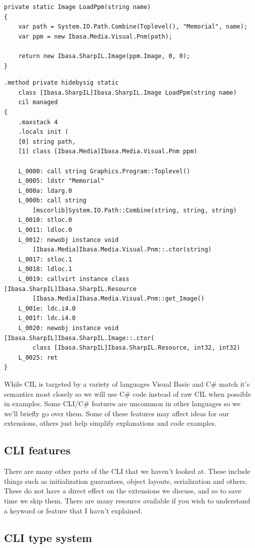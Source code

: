 \documentclass[english]{report}
\begin{document}
\begin{lstlisting}[keywordstyle={\color{blue}},language=sharpc,caption={LoadPpm C\#}]
private static Image LoadPpm(string name)
{
	var path = System.IO.Path.Combine(Toplevel(), "Memorial", name);
	var ppm = new Ibasa.Media.Visual.Pnm(path);

	return new Ibasa.SharpIL.Image(ppm.Image, 0, 0);
}
\end{lstlisting}
\begin{lstlisting}[caption={LoadPpm CIL}]
.method private hidebysig static 
	class [Ibasa.SharpIL]Ibasa.SharpIL.Image LoadPpm(string name) 
	cil managed 
{
	.maxstack 4
	.locals init (
	[0] string path,
	[1] class [Ibasa.Media]Ibasa.Media.Visual.Pnm ppm)
 
	L_0000: call string Graphics.Program::Toplevel()
	L_0005: ldstr "Memorial"
	L_000a: ldarg.0
	L_000b: call string 
		[mscorlib]System.IO.Path::Combine(string, string, string)
	L_0010: stloc.0
	L_0011: ldloc.0
	L_0012: newobj instance void 
		[Ibasa.Media]Ibasa.Media.Visual.Pnm::.ctor(string)
	L_0017: stloc.1
	L_0018: ldloc.1
	L_0019: callvirt instance class [Ibasa.SharpIL]Ibasa.SharpIL.Resource
		[Ibasa.Media]Ibasa.Media.Visual.Pnm::get_Image()
	L_001e: ldc.i4.0
	L_001f: ldc.i4.0
	L_0020: newobj instance void [Ibasa.SharpIL]Ibasa.SharpIL.Image::.ctor(
		class [Ibasa.SharpIL]Ibasa.SharpIL.Resource, int32, int32)
	L_0025: ret
}
\end{lstlisting}


While CIL is targeted by a variety of languages Visual Basic and C\#
match it's semantics most closely so we will use C\# code instead
of raw CIL when possible in examples. Some CLI/C\# features are uncommon
in other languages so we we'll briefly go over them. Some of these
features may affect ideas for our extensions, others just help simplify
explanations and code examples.


\subsection{CLI features}

There are many other parts of the CLI that we haven\textquoteright{}t
looked at. These include things such as initialization guarantees,
object layouts, serialization and others. These do not have a direct
effect on the extensions we discuss, and so to save time we skip them.
There are many resource available if you wish to understand a keyword
or feature that I havn't explained.


\subsection{CLI type system}
\end{document}
